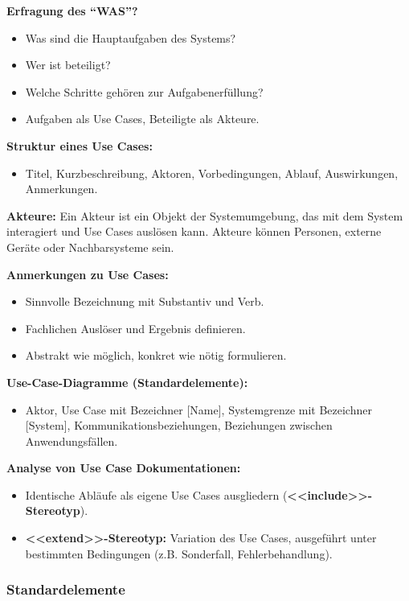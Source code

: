 \documentclass[11pt, a4paper]{article}
\begin{document}
\noindent\textbf{Erfragung des “WAS”?}
\begin{itemize}
    \item Was sind die Hauptaufgaben des Systems?
    \item Wer ist beteiligt?
    \item Welche Schritte gehören zur Aufgabenerfüllung?
    \item Aufgaben als Use Cases, Beteiligte als Akteure.
\end{itemize}

\noindent\textbf{Struktur eines Use Cases:}
\begin{itemize}
    \item Titel, Kurzbeschreibung, Aktoren, Vorbedingungen, Ablauf, Auswirkungen, Anmerkungen.
\end{itemize}

\noindent\textbf{Akteure:} Ein Akteur ist ein Objekt der Systemumgebung, das mit dem System interagiert und Use Cases auslösen kann. Akteure können Personen, externe Geräte oder Nachbarsysteme sein.

\noindent\textbf{Anmerkungen zu Use Cases:}
\begin{itemize}
    \item Sinnvolle Bezeichnung mit Substantiv und Verb.
    \item Fachlichen Auslöser und Ergebnis definieren.
    \item Abstrakt wie möglich, konkret wie nötig formulieren.
\end{itemize}

\noindent\textbf{Use-Case-Diagramme (Standardelemente):}
\begin{itemize}
    \item Aktor, Use Case mit Bezeichner [Name], Systemgrenze mit Bezeichner [System], Kommunikationsbeziehungen, Beziehungen zwischen Anwendungsfällen.
\end{itemize}

\noindent\textbf{Analyse von Use Case Dokumentationen:}
\begin{itemize}
    \item Identische Abläufe als eigene Use Cases ausgliedern (\textbf{<<include>>-Stereotyp}).
    \item \textbf{<<extend>>-Stereotyp:} Variation des Use Cases, ausgeführt unter bestimmten Bedingungen (z.B. Sonderfall, Fehlerbehandlung).
\end{itemize}

\newpage

\subsubsection{Standardelemente}
\end{document}
